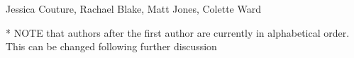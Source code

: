 Jessica Couture,
Rachael Blake,
Matt Jones,
Colette Ward

* NOTE that authors after the first author are currently in alphabetical order.  This can be changed following further discussion

